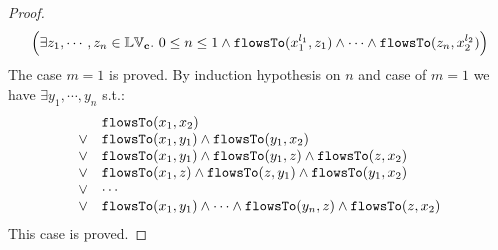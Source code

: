 \begin{proof}
\[  \Big( \exists z_1, \cdots, z_n \in \mathbb{LV}_{{\boldsymbol{\mathbf{c}}}}. ~ 0 \leq n \leq 1 \land
  \mathtt{flowsTo}(x_1^{l_1}, z_1) 
  \land \cdots \land \mathtt{flowsTo}(z_n, x_2^{l_2}) \Big)
\]
The case $m = 1$ is proved.
%
By induction hypothesis on $n$ and case of $m = 1$ we have $\exists y_1, \cdots, y_n$ s.t.:
\[
\begin{array}{ll}
      & \mathtt{flowsTo}(x_1, x_2) \\
  \lor  & \mathtt{flowsTo}(x_1, y_1) \land \mathtt{flowsTo}(y_1, x_2)\\
  \lor  & \mathtt{flowsTo}(x_1, y_1) \land \mathtt{flowsTo}(y_1, z) \land \mathtt{flowsTo}(z, x_2) \\
  \lor  & \mathtt{flowsTo}(x_1, z) \land \mathtt{flowsTo}(z, y_1) \land \mathtt{flowsTo}(y_1, x_2) \\
  \lor  & \cdots \\
  \lor  & \mathtt{flowsTo}(x_1, y_1) \land \cdots \land \mathtt{flowsTo}(y_n, z) \land \mathtt{flowsTo}(z, x_2) \\
\end{array}
\]
This case is proved.
\end{proof}